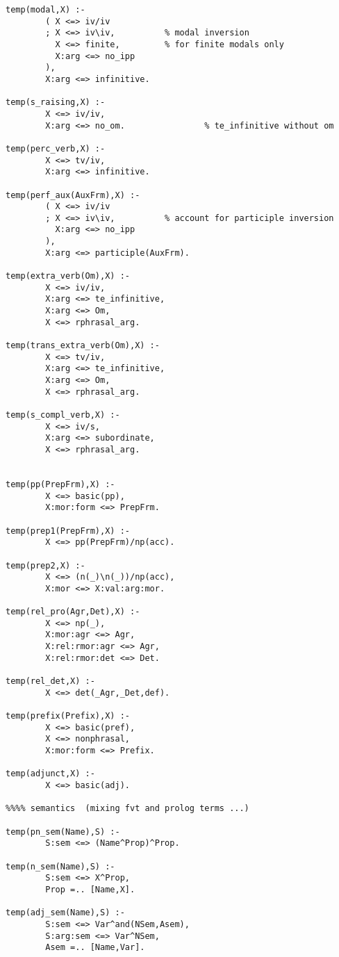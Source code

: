 \begin{verbatim}
temp(modal,X) :-
        ( X <=> iv/iv
        ; X <=> iv\iv,          % modal inversion
          X <=> finite,         % for finite modals only
          X:arg <=> no_ipp
        ),
        X:arg <=> infinitive.
        
temp(s_raising,X) :-
        X <=> iv/iv,
        X:arg <=> no_om.                % te_infinitive without om
        
temp(perc_verb,X) :-
        X <=> tv/iv,
        X:arg <=> infinitive.
        
temp(perf_aux(AuxFrm),X) :-
        ( X <=> iv/iv
        ; X <=> iv\iv,          % account for participle inversion
          X:arg <=> no_ipp
        ),
        X:arg <=> participle(AuxFrm).

temp(extra_verb(Om),X) :-
        X <=> iv/iv,
        X:arg <=> te_infinitive,
        X:arg <=> Om,
        X <=> rphrasal_arg.
        
temp(trans_extra_verb(Om),X) :-
        X <=> tv/iv,
        X:arg <=> te_infinitive,
        X:arg <=> Om,
        X <=> rphrasal_arg.
        
temp(s_compl_verb,X) :-
        X <=> iv/s,
        X:arg <=> subordinate,
        X <=> rphrasal_arg.
        
         
temp(pp(PrepFrm),X) :-
        X <=> basic(pp),
        X:mor:form <=> PrepFrm.
                
temp(prep1(PrepFrm),X) :-
        X <=> pp(PrepFrm)/np(acc).
        
temp(prep2,X) :-
        X <=> (n(_)\n(_))/np(acc),
        X:mor <=> X:val:arg:mor.
                        
temp(rel_pro(Agr,Det),X) :-
        X <=> np(_),
        X:mor:agr <=> Agr,
        X:rel:rmor:agr <=> Agr,
        X:rel:rmor:det <=> Det.
        
temp(rel_det,X) :-
        X <=> det(_Agr,_Det,def).
        
temp(prefix(Prefix),X) :-
        X <=> basic(pref),
        X <=> nonphrasal,
        X:mor:form <=> Prefix.

temp(adjunct,X) :-
        X <=> basic(adj).
        
%%%% semantics  (mixing fvt and prolog terms ...)

temp(pn_sem(Name),S) :-
        S:sem <=> (Name^Prop)^Prop.
                
temp(n_sem(Name),S) :-
        S:sem <=> X^Prop,
        Prop =.. [Name,X].
                        
temp(adj_sem(Name),S) :-
        S:sem <=> Var^and(NSem,Asem),
        S:arg:sem <=> Var^NSem,
        Asem =.. [Name,Var].
                

\end{verbatim}
